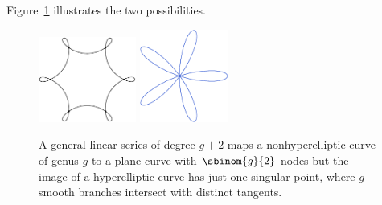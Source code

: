 Figure~\ref{Fig9.4} illustrates the two possibilities.

\begin{figure}
\leavevmode{}\hbox{\includegraphics[height=1.1in]{main/Fig09-4A}}
\qquad
\includegraphics[height=1.2in]{main/five}
\caption{A general linear series of degree $g+2$ maps a nonhyperelliptic
curve of genus $g$
to a plane curve with $\protect\sbinom{g}{2}$ nodes
but the image of a
hyperelliptic curve has
just one singular point, where $g$ smooth branches intersect with
distinct tangents.
}
\label{Fig9.4}
\end{figure}

